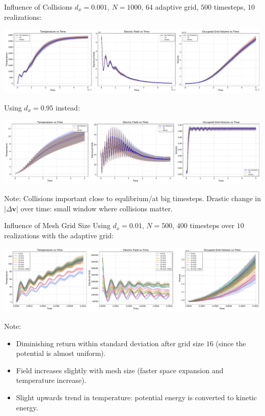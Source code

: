 \begin{frame}{Influence of Collisions}
    $d_x = 0.001$, $N = 1000$, $64$ adaptive grid, $500$ timesteps, $10$ realizations:
    \begin{minipage}{\textwidth}
        \centering
        \includegraphics[width=\textwidth]{ressources/test2/T_E_V_comparison_collision_algos_0.00005.pdf}
    \end{minipage}
    \vfill
    Using $d_x = 0.95$ instead:
    \begin{minipage}{\textwidth}
        \centering
        \includegraphics[width=\textwidth]{ressources/test2/T_E_V_comparison_collision_algos_5.0.pdf}
    \end{minipage}
    Note: Collisions important close to equlibrium/at big timesteps. Drastic change in $|\Delta\mathbf{v}|$ over time: small window where collisions matter. 
\end{frame}

\begin{frame}{Influence of Mesh Grid Size}
    Using $d_x = 0.01$, $N = 500$, $400$ timesteps over $10$ realizations with the adaptive grid:
    \begin{minipage}{\textwidth}
        \centering
        \includegraphics[width=\textwidth]{ressources/test2/T_E_V_comparison_grid_sizing.pdf}
    \end{minipage}
    Note: 
    \begin{itemize}
        \item Diminishing return within standard deviation after grid size $16$ (since the potential is almost uniform). 
        \item Field increases slightly with mesh size (faster space expansion and temperature increase). 
        \item Slight upwards trend in temperature: potential energy is converted to kinetic energy. 
    \end{itemize}
\end{frame}

